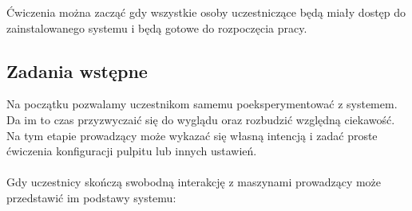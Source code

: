 \documentclass[10pt,a4paper]{article}
\begin{document}
Ćwiczenia można zacząć gdy wszystkie osoby uczestniczące będą miały dostęp do zainstalowanego systemu i będą gotowe do rozpoczęcia pracy.

\subsection{Zadania wstępne}
Na początku pozwalamy uczestnikom samemu poeksperymentować z systemem. Da im to czas przyzwyczaić się do wyglądu oraz rozbudzić względną ciekawość. Na tym etapie prowadzący może wykazać się własną intencją i zadać proste ćwiczenia konfiguracji pulpitu lub innych ustawień.\\\\
Gdy uczestnicy skończą swobodną interakcję z maszynami prowadzący może przedstawić im podstawy systemu:
\end{document}
